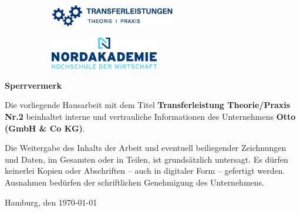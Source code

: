 \pagebreak
\thispagestyle{empty}

\setlength{\parindent}{0pt}

\begin{figure}[t]
	\vspace*{-2.9\baselineskip}
	\begin{subfigure}[b]{0.6\textwidth}
		\includegraphics[height=1cm, left]{image/transferleistung}
	\end{subfigure}
	\begin{subfigure}[b]{0.4\textwidth}
		\includegraphics[height=1.4cm, right]{image/nak_new_logo_big}
	\end{subfigure}
\end{figure}
 
\begin{figure}[t]
	
\end{figure}

\vspace*{\fill}

\large
\textcolor{blue!30!black}{\textbf{Sperrvermerk}}
\newline

\normalsize
Die vorliegende Hausarbeit mit dem Titel \textbf{Transferleistung Theorie/Praxis Nr.2}
beinhaltet interne und vertrauliche Informationen des Unternehmens \textbf{Otto (GmbH \& Co KG)}.
	
Die Weitergabe des Inhalts der Arbeit und eventuell beiliegender Zeichnungen und Daten, im Gesamten oder in Teilen, ist grundsätzlich untersagt. Es dürfen keinerlei Kopien oder Abschriften – auch in digitaler Form – gefertigt werden. Ausnahmen bedürfen der schriftlichen Genehmigung des Unternehmens.

	Hamburg, den \today

\vspace*{\fill}
